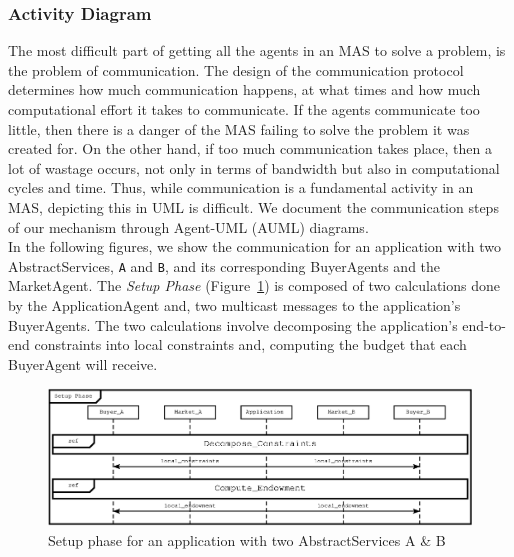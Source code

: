 \documentclass[10pt,journal,compsoc]{IEEEtran}
\begin{document}
\subsubsection{Activity Diagram} The most difficult part of getting all the agents in an MAS to solve a problem, is the problem of communication. The design of the communication protocol determines how much communication happens, at what times and how much computational effort it takes to communicate. If the agents communicate too little, then there is a danger of the MAS failing to solve the problem it was created for. On the other hand, if too much communication takes place, then a lot of wastage occurs, not only in terms of bandwidth but also in computational cycles and time. Thus, while communication is a fundamental activity in an MAS, depicting this in UML is difficult. 
We document the communication steps of our mechanism through Agent-UML (AUML) diagrams.\\
In the following figures, we show the communication for an application with two AbstractServices, \texttt{A} and \texttt{B}, and its corresponding BuyerAgents and the MarketAgent. The \emph{Setup Phase} (Figure~\ref{fig:setup_phase}) is composed of two calculations done by the ApplicationAgent and, two multicast messages to the application's BuyerAgents. The two calculations involve decomposing the application's end-to-end constraints into local constraints and, computing the budget that each BuyerAgent will receive.
\begin{figure}[htbp]
\centering
\includegraphics[scale=0.7]{Figure5.eps}
\caption{Setup phase for an application with two AbstractServices A \& B \label{fig:setup_phase}}
\end{figure}
\end{document}
